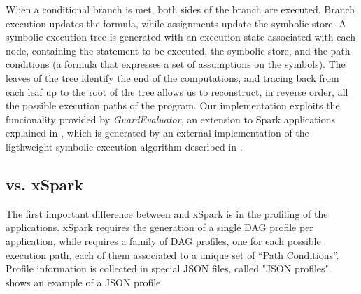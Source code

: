 When a conditional branch is met, both sides of the branch are executed. Branch execution updates the formula, while assignments update the symbolic store. 
A symbolic execution tree is generated with an execution state associated with each node, containing the statement to be executed, the symbolic store, and the path conditions (a formula that expresses a set of assumptions on the symbols). The leaves of the tree identify the end of the computations, and tracing back from each leaf up to the root of the tree allows us to reconstruct, in reverse order, all the possible execution paths of the program. Our implementation exploits the funcionality provided by  \textit{GuardEvaluator}, an extension to Spark applications explained in , which is generated by an external implementation of the ligthweight symbolic execution algorithm  described in .

\subsection{\tool vs. xSpark}
The first important difference between \tool and xSpark is in the profiling of the applications. xSpark requires the generation of a single DAG profile per application, while \tool requires a family of DAG profiles, one for each possible execution path, each of them associated to a unique set of “Path Conditions”. Profile information is collected in special JSON files, called "JSON profiles".  shows an example of a JSON profile.


